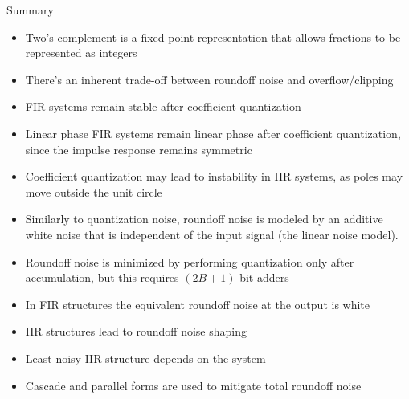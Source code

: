 \documentclass[10pt]{beamer}
\begin{document}
%
\begin{frame}{Summary}
\begin{itemize}
	\item Two's complement is a fixed-point representation that allows fractions to be represented as integers
	\item There's an inherent trade-off between roundoff noise and overflow/clipping
	\item FIR systems remain stable after coefficient quantization
	\item Linear phase FIR systems remain linear phase after coefficient quantization, since the impulse response remains symmetric
	\item Coefficient quantization may lead to instability in IIR systems, as poles may move outside the unit circle
	\item Similarly to quantization noise, roundoff noise is modeled by an additive white noise that is independent of the input signal (the linear noise model).
	\item Roundoff noise is minimized by performing quantization only after accumulation, but this requires $(2B+1)$-bit adders
	\item In FIR structures the equivalent roundoff noise at the output is white
	\item IIR structures lead to roundoff noise shaping
	\item Least noisy IIR structure depends on the system
	\item Cascade and parallel forms are used to mitigate total roundoff noise
\end{itemize}
\end{frame}
\end{document}
